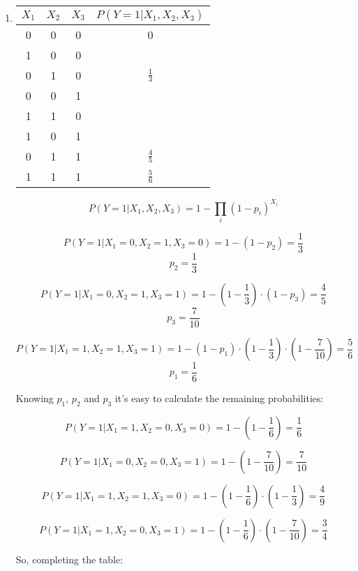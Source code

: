 \documentclass[11]{article}
\begin{document}
\begin{enumerate}[label=(\alph*)]
\item
\begin{table}[htp]
\centering
\begin{tabular}{|c|c|c|c|}
\hline
$X_1$ & $X_2$ & $X_3$ & $P(Y=1|X_1,X_2,X_3)$ \\ \hline
0     & 0     & 0     & 0                    \\ \hline
1     & 0     & 0     &                      \\ \hline
0     & 1     & 0     & $\frac{1}{3}$        \\ \hline
0     & 0     & 1     &                      \\ \hline
1     & 1     & 0     &                      \\ \hline
1     & 0     & 1     &                      \\ \hline
0     & 1     & 1     & $\frac{4}{5}$        \\ \hline
1     & 1     & 1     & $\frac{5}{6}$        \\ \hline
\end{tabular}
\end{table}

$$P(Y=1|X_1,X_2,X_3)= 1-\prod_i (1-p_i)^{X_i}$$


$$P(Y=1|X_1=0,X_2=1,X_3=0)= 1-(1-p_2) = \frac{1}{3}$$
$$p_2=\frac{1}{3}$$

$$P(Y=1|X_1=0,X_2=1,X_3=1)= 1-(1-\frac{1}{3})\cdot(1-p_3) = \frac{4}{5}$$
$$p_3=\frac{7}{10}$$

$$P(Y=1|X_1=1,X_2=1,X_3=1)= 1-(1-p_1)\cdot(1-\frac{1}{3})\cdot(1-\frac{7}{10}) = \frac{5}{6}$$
$$p_1=\frac{1}{6}$$

Knowing $p_1$, $p_2$ and $p_3$ it's easy to calculate the remaining probabilities:

$$P(Y=1|X_1=1,X_2=0,X_3=0)= 1-(1-\frac{1}{6}) = \frac{1}{6}$$

$$P(Y=1|X_1=0,X_2=0,X_3=1)= 1-(1-\frac{7}{10}) = \frac{7}{10}$$

$$P(Y=1|X_1=1,X_2=1,X_3=0)= 1-(1-\frac{1}{6})\cdot(1-\frac{1}{3}) = \frac{4}{9}$$

$$P(Y=1|X_1=1,X_2=0,X_3=1)= 1-(1-\frac{1}{6})\cdot(1-\frac{7}{10}) = \frac{3}{4}$$

So, completing the table:
\clearpage


\end{enumerate}
\end{document}
